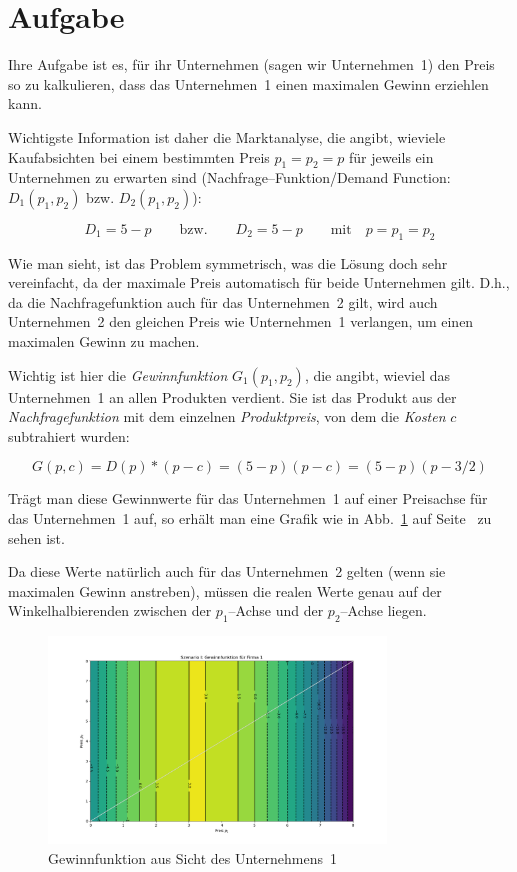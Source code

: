 \documentclass[paper=a4,notitlepage,parskip=half,plainheadsepline]{scrartcl}
\begin{document}
\section{Aufgabe}
Ihre Aufgabe ist es, für ihr Unternehmen (sagen wir Unternehmen~1) den Preis so zu kalkulieren, dass das Unternehmen~1 einen maximalen Gewinn erziehlen kann.

Wichtigste Information ist daher die Marktanalyse, die angibt, wieviele Kaufabsichten bei einem bestimmten Preis $p_1=p_2=p$ für jeweils ein Unternehmen zu erwarten sind (Nachfrage--Funktion/Demand Function: $D_1(p_1,p_2)$ bzw. $D_2(p_1,p_2)$):

\begin{equation}
D_1 = 5 - p \qquad\text{bzw.}\qquad D_2 = 5 - p \qquad\text{mit}\quad p=p_1=p_2 
\end{equation}

Wie man sieht, ist das Problem symmetrisch, was die Lösung doch sehr vereinfacht, da der maximale Preis automatisch für beide Unternehmen gilt.
D.h., da die Nachfragefunktion auch für das Unternehmen~2 gilt, wird auch Unternehmen~2 den gleichen Preis wie Unternehmen~1 verlangen, um einen maximalen Gewinn zu machen.

Wichtig ist hier die \emph{Gewinnfunktion} $G_1(p_1,p_2)$, die angibt, wieviel das Unternehmen~1 an allen Produkten verdient.
Sie ist das Produkt aus der \emph{Nachfragefunktion} mit dem einzelnen \emph{Produktpreis}, von dem die \emph{Kosten} $c$ subtrahiert wurden:

$$G(p,c) = D(p) * (p-c) = (5-p)(p-c) = (5-p)(p-3/2)$$

Trägt man diese Gewinnwerte für das Unternehmen~1 auf einer Preisachse für das Unternehmen~1 auf, so erhält man eine Grafik wie in Abb.~\ref{fig:Grafik} auf Seite~\pageref{fig:Grafik} zu sehen ist. 

Da diese Werte natürlich auch für das Unternehmen~2 gelten (wenn sie maximalen Gewinn anstreben), müssen  die realen Werte genau auf der Winkelhalbierenden zwischen der $p_1$--Achse und der $p_2$--Achse liegen.

\begin{figure}
\begin{center}
\includegraphics[width=0.8\textwidth]{nash1.png}
\end{center}
\caption{Gewinnfunktion aus Sicht des Unternehmens~1}
\label{fig:Grafik}
\end{figure}
\end{document}

